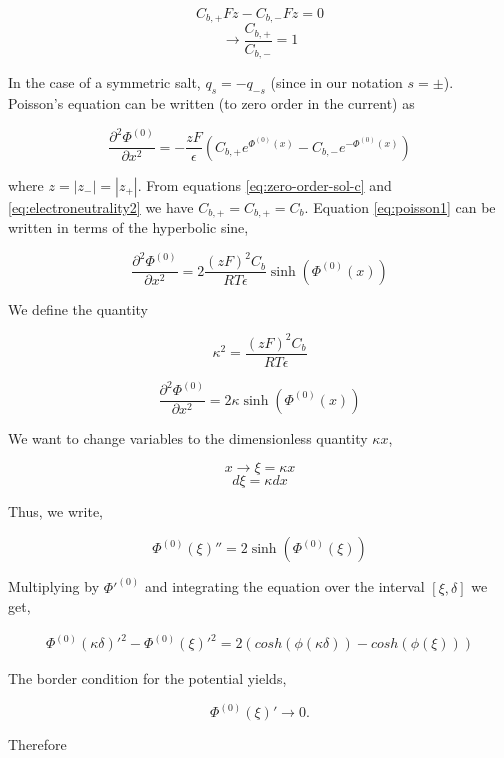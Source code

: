 $$C_{b,+}Fz-C_{b,-}Fz=0$$
$$\rightarrow \frac{C_{b,+}}{C_{b,-}}=1$$

In the case of a symmetric salt, $q_s=-q_{-s}$ (since in our notation $s=\pm$). Poisson's equation can be written (to zero order in the current) as

\begin{equation}
\label{eq:poisson1}
\frac{\partial^2 \Phi^{(0)}}{\partial x^2} = -\frac{zF}{\epsilon} \left(C_{b,+}e^{\Phi^{(0)}(x)}-C_{b,-}e^{-\Phi^{(0)}(x)}\right)
\end{equation}

where $z=|z_-|=|z_+|$. From equations \ref{eq:zero-order-sol-c}  and \ref{eq:electroneutrality2} we have $C_{b,+}=C_{b,+} = C_b$. Equation \ref{eq:poisson1} can be written in terms of the hyperbolic sine,

\begin{equation}
\label{eq:poisson2}
\frac{\partial^2 \Phi^{(0)}}{\partial x^2} = 2\frac{(zF)^2C_b}{RT\epsilon}\sinh{\left(\Phi^{(0)}(x)\right)}
\end{equation}

We define the quantity  

$$\kappa^2  = \frac{(zF)^2C_b}{RT\epsilon}$$

\begin{equation}
\frac{\partial^2 \Phi^{(0)}}{\partial x^2} = 2\kappa \sinh{\left(\Phi^{(0)}(x)\right)}
\end{equation}

We want to change variables to the dimensionless quantity $\kappa x$,

$$x \rightarrow \xi = \kappa x$$
 $$d \xi  = \kappa d x $$
 
Thus, we write,

\begin{equation}
\Phi^{(0)}(\xi)''= 2\sinh{\left(\Phi^{(0)}(\xi)\right)}
\end{equation}

Multiplying by  $\Phi'^{(0)}$ and integrating the equation over the interval $[\xi, \delta]$ we get,
 
\begin{align}
\Phi^{(0)}(\kappa \delta)'^2  -\Phi^{(0)}(\xi)'^2   = 2(cosh(\phi(\kappa \delta))-cosh(\phi(\xi)))
\end{align}

The border condition for the potential yields, 

$$\Phi^{(0)}(\xi)' \rightarrow 0.$$

Therefore

